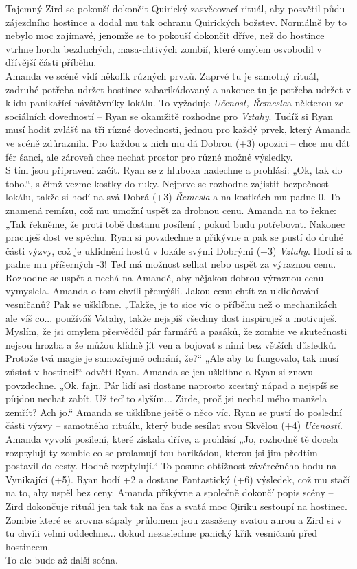 Tajemný Zird se pokouší dokončit Quirický zasvěcovací rituál, aby posvětil půdu zájezdního hostince a dodal mu tak ochranu Quirických božstev. Normálně by to nebylo moc zajímavé, jenomže se to pokouší dokončit dříve, než do hostince vtrhne horda bezduchých, masa-chtivých zombií, které omylem osvobodil v dřívější části příběhu.\\
Amanda ve scéně vidí několik různých prvků. Zaprvé tu je samotný rituál, zadruhé potřeba udržet hostinec zabarikádovaný a nakonec tu je potřeba udržet v klidu panikařící návštěvníky lokálu. To vyžaduje \textit{Učenost, Řemesla}a některou ze sociálních dovedností – Ryan se okamžitě rozhodne pro \textit{Vztahy}. Tudíž si Ryan musí hodit zvlášť na tři různé dovednosti, jednou pro každý prvek, který Amanda ve scéně zdůraznila. Pro každou z nich mu dá Dobrou (+3) opozici – chce mu dát fér šanci, ale zároveň chce nechat prostor pro různé možné výsledky.\\
S tím jsou připraveni začít. Ryan se z hluboka nadechne a prohlásí: „Ok, tak do toho.“, s čímž vezme kostky do ruky. Nejprve se rozhodne zajistit bezpečnost lokálu, takže si hodí na svá Dobrá (+3) \textit{Řemesla} a na kostkách mu padne 0. To znamená remízu, což mu umožní uspět za drobnou cenu. Amanda na to řekne: „Tak řekněme, že proti tobě dostanu posílení , pokud budu potřebovat. Nakonec pracuješ dost ve spěchu. Ryan si povzdechne a přikývne a pak se pustí do druhé části výzvy, což je uklidnění hostů v lokále svými Dobrými (+3) \textit{Vztahy}. Hodí si a padne mu příšerných -3! Teď má možnost selhat nebo uspět za výraznou cenu. Rozhodne se uspět a nechá na Amandě, aby nějakou dobrou výraznou cenu vymyslela. Amanda o tom chvíli přemýšlí. Jakou cenu chtít za uklidňování vesničanů? Pak se ušklíbne. „Takže, je to sice víc o příběhu než o mechanikách ale víš co... používáš Vztahy, takže nejspíš všechny dost inspiruješ a motivuješ. Myslím, že jsi omylem přesvědčil pár farmářů a pasáků, že zombie ve skutečnosti nejsou hrozba a že můžou klidně jít ven a bojovat s nimi bez větších důsledků. Protože tvá magie je samozřejmě ochrání, že?“ „Ale aby to fungovalo, tak musí zůstat v hostinci!“ odvětí Ryan. Amanda se jen ušklíbne a Ryan si znovu povzdechne. „Ok, fajn. Pár lidí asi dostane naprosto zcestný nápad a nejspíš se půjdou nechat zabít. Už teď to slyším... Zirde, proč jsi nechal mého manžela zemřít? Ach jo.“ Amanda se ušklíbne ještě o něco víc. Ryan se pustí do poslední části výzvy – samotného rituálu, který bude sesílat svou Skvělou (+4) \textit{Učeností}. Amanda vyvolá posílení, které získala dříve, a prohlásí „Jo, rozhodně tě docela rozptylují ty zombie co se prolamují tou barikádou, kterou jsi jim předtím postavil do cesty. Hodně rozptylují.“ To posune obtížnost závěrečného hodu na Vynikající (+5). Ryan hodí +2 a dostane Fantastický (+6) výsledek, což mu stačí na to, aby uspěl bez ceny. Amanda přikývne a společně dokončí popis scény – Zird dokončuje rituál jen tak tak na čas a svatá moc Qiriku sestoupí na hostinec. Zombie které se zrovna sápaly průlomem jsou zasaženy svatou aurou a Zird si v tu chvíli velmi oddechne... dokud nezaslechne panický křik vesničanů před hostincem.\\
To ale bude až další scéna.


